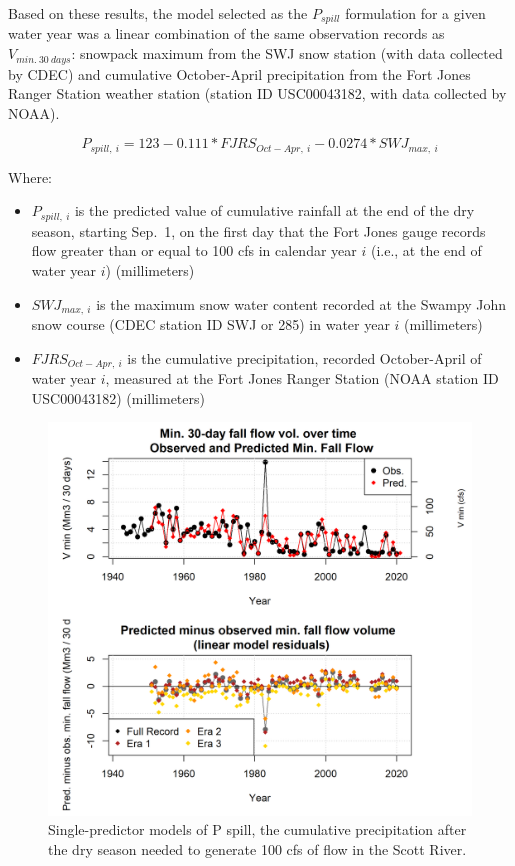\documentclass[
]{article}
\providecommand{\tightlist}{%
  \setlength{\itemsep}{0pt}\setlength{\parskip}{0pt}}
\begin{document}
Based on these results, the model selected as the \(P_{spill}\)
formulation for a given water year was a linear combination of the same
observation records as \(V_{min.~30~days}\): snowpack maximum from the
SWJ snow station (with data collected by CDEC) and cumulative
October-April precipitation from the Fort Jones Ranger Station weather
station (station ID USC00043182, with data collected by NOAA).

\[P_{spill,~i} = 123 -0.111 * FJRS_{Oct-Apr,~i} - 0.0274* SWJ_{max,~i}\]

Where:

\begin{itemize}
\tightlist
\item
  \(P_{spill,~i}\) is the predicted value of cumulative rainfall at the
  end of the dry season, starting Sep.~1, on the first day that the Fort
  Jones gauge records flow greater than or equal to 100 cfs in calendar
  year \(i\) (i.e., at the end of water year \(i\)) (millimeters)
\item
  \(SWJ_{max,~i}\) is the maximum snow water content recorded at the
  Swampy John snow course (CDEC station ID SWJ or 285) in water year
  \(i\) (millimeters)
\item
  \(FJRS_{Oct-Apr,~i}\) is the cumulative precipitation, recorded
  October-April of water year \(i\), measured at the Fort Jones Ranger
  Station (NOAA station ID USC00043182) (millimeters)
\end{itemize}

\begin{figure}
\includegraphics[width=1\linewidth]{f13} \caption{\label{fig:one_predictor_model_p_spill} Single-predictor models of P spill, the cumulative precipitation after the dry season needed to generate 100 cfs of flow in the Scott River.}\label{fig:one_predictor_model_p_spill}
\end{figure}
\end{document}
